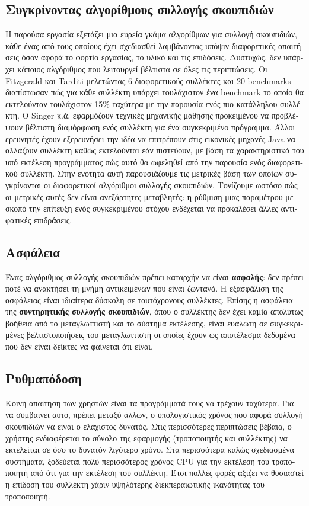 \begin{greek}
\section{Συγκρίνοντας αλγορίθμους συλλογής σκουπιδιών}
Η παρούσα εργασία εξετάζει μια ευρεία γκάμα αλγορίθμων για συλλογή
σκουπιδιών, κάθε ένας από τους οποίους έχει σχεδιασθεί λαμβάνοντας
υπόψιν διαφορετικές απαιτήσεις όσον αφορά το φορτίο εργασίας,
το υλικό και τις επιδόσεις. Δυστυχώς, δεν υπάρχει κάποιος αλγόριθμος
που λειτουργεί βέλτιστα σε όλες τις περιπτώσεις. Οι Fitzgerald
και Tarditi \cite{DBLP:conf/iwmm/FitzgeraldT00} μελετώντας 6 
διαφορετικούς συλλέκτες και 20 benchmarks διαπίστωσαν πώς για
κάθε συλλέκτη υπάρχει τουλάχιστον ένα benchmark το οποίο θα εκτελούνταν
τουλάχιστον 15\% ταχύτερα με την παρουσία ενός πιο κατάλληλου
συλλέκτη. Ο Singer κ.ά. \cite{DBLP:conf/iwmm/SingerBWC07} εφαρμόζουν
τεχνικές μηχανικής μάθησης προκειμένου να προβλέψουν βέλτιστη
διαμόρφωση ενός συλλέκτη για ένα συγκεκριμένο πρόγραμμα. Άλλοι
ερευνητές \cite{DBLP:conf/jvm/Printezis01,DBLP:conf/iwmm/SomanKB04}
έχουν εξερευνήσει την ιδέα να επιτρέπουν στις εικονικές μηχανές
Java να αλλάζουν συλλέκτη καθώς εκτελούνται εάν πιστεύουν, με
βάση τα χαρακτηριστικά του υπό εκτέλεση προγράμματος πώς αυτό
θα ωφεληθεί από την παρουσία ενός διαφορετικού συλλέκτη. Στην
ενότητα αυτή παρουσιάζουμε τις μετρικές βάση των οποίων συγκρίνονται
οι διαφορετικοί αλγόριθμοι συλλογής σκουπιδιών. Τονίζουμε ωστόσο
πώς οι μετρικές αυτές δεν είναι ανεξάρτητες μεταβλητές: η ρύθμιση
μιας παραμέτρου με σκοπό την επίτευξη ενός συγκεκριμένου στόχου
ενδέχεται να προκαλέσει άλλες αντιφατικές επιδράσεις.

\subsection{Ασφάλεια}
Ένας αλγόριθμος συλλογής σκουπιδιών πρέπει καταρχήν να είναι
\textbf{ασφαλής}: δεν πρέπει ποτέ να ανακτήσει τη μνήμη αντικειμένων
που είναι ζωντανά. Η εξασφάλιση της ασφάλειας είναι ιδιαίτερα
δύσκολη σε ταυτόχρονους συλλέκτες. Επίσης η ασφάλεια της
\textbf{συντηρητικής συλλογής σκουπιδιών}, όπου ο συλλέκτης δεν
έχει καμία απολύτως βοήθεια από το μεταγλωττιστή και το σύστημα
εκτέλεσης, είναι ευάλωτη σε συγκεκριμένες βελτιστοποιήσεις του
μεταγλωττιστή οι οποίες έχουν ως αποτέλεσμα δεδομένα που
δεν είναι δείκτες να φαίνεται ότι είναι.

\subsection{Ρυθμαπόδοση}
Κοινή απαίτηση των χρηστών είναι τα προγράμματά τους να τρέχουν
ταχύτερα. Για να συμβαίνει αυτό, πρέπει μεταξύ άλλων, ο υπολογιστικός
χρόνος που αφορά συλλογή σκουπιδιών να είναι ο ελάχιστος δυνατός.
Στις περισσότερες περιπτώσεις βέβαια, ο χρήστης ενδιαφέρεται το
σύνολο της εφαρμογής (τροποποιητής και συλλέκτης) να εκτελείται
σε όσο το δυνατόν λιγότερο χρόνο. Στα περισσότερα καλώς σχεδιασμένα
συστήματα, ξοδεύεται πολύ περισσότερος χρόνος CPU για την εκτέλεση
του τροποποιητή από ότι για την εκτέλεση του συλλέκτη. Έτσι πολλές
φορές αξίζει να θυσιαστεί η επίδοση του συλλέκτη χάριν υψηλότερης 
διεκπεραιωτικής ικανότητας του τροποποιητή.


\end{greek}
